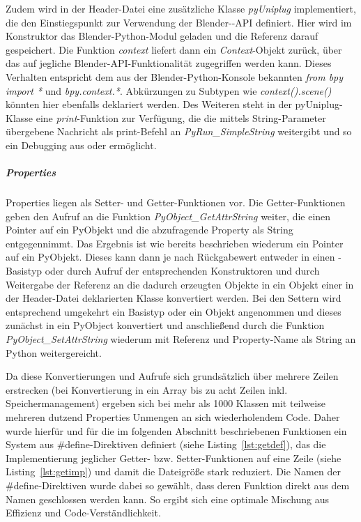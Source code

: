 Zudem wird in der Header-Datei eine zusätzliche Klasse \emph{pyUniplug} implementiert, die den Einstiegspunkt zur Verwendung der Blender-\CC-API definiert. Hier wird im Konstruktor das Blender-Python-Modul geladen und die Referenz darauf gespeichert. Die Funktion \emph{context} liefert dann ein \emph{Context}-Objekt zurück, über das auf jegliche Blender-API-Funktionalität zugegriffen werden kann. Dieses Verhalten entspricht dem aus der Blender-Python-Konsole bekannten \emph{from bpy import *} und \emph{bpy.context.*}. Abkürzungen zu Subtypen wie \emph{context().scene()} könnten hier ebenfalls deklariert werden. Des Weiteren steht in der pyUniplug-Klasse eine \emph{print}-Funktion zur Verfügung, die die mittels String-Parameter übergebene Nachricht als print-Befehl an \emph{PyRun\_SimpleString} weitergibt und so ein Debugging aus \CC oder \CS ermöglicht. 

\subparagraph{Properties}

Properties liegen als Setter- und Getter-Funktionen vor. Die Getter-Funktionen geben den Aufruf an die Funktion \emph{PyObject\_GetAttrString} weiter, die einen Pointer auf ein PyObjekt und die abzufragende Property als String entgegennimmt. Das Ergebnis ist wie bereits beschrieben wiederum ein Pointer auf ein PyObjekt. Dieses kann dann je nach Rückgabewert entweder in einen \CC-Basistyp oder durch Aufruf der entsprechenden Konstruktoren und durch Weitergabe der Referenz an die dadurch erzeugten Objekte in ein Objekt einer in der Header-Datei deklarierten Klasse konvertiert werden. Bei den Settern wird entsprechend umgekehrt ein Basistyp oder ein Objekt angenommen und dieses zunächst in ein PyObject konvertiert und anschließend durch die Funktion \emph{PyObject\_SetAttrString} wiederum mit Referenz und Property-Name als String an Python weitergereicht.

Da diese Konvertierungen und Aufrufe sich grundsätzlich über mehrere Zeilen erstrecken (bei Konvertierung in ein Array bis zu acht Zeilen inkl. Speichermanagement) ergeben sich bei mehr als 1000 Klassen mit teilweise mehreren dutzend Properties Unmengen an sich wiederholendem Code. Daher wurde hierfür und für die im folgenden Abschnitt beschriebenen Funktionen ein System aus \#define-Direktiven definiert (siehe Listing~\ref{lst:getdef}), das die Implementierung jeglicher Getter- bzw. Setter-Funktionen auf eine Zeile (siehe Listing~\ref{lst:getimp}) und damit die Dateigröße stark reduziert. Die Namen der \#define-Direktiven wurde dabei so gewählt, dass deren Funktion direkt aus dem Namen geschlossen werden kann. So ergibt sich eine optimale Mischung aus Effizienz und Code-Verständlichkeit.

